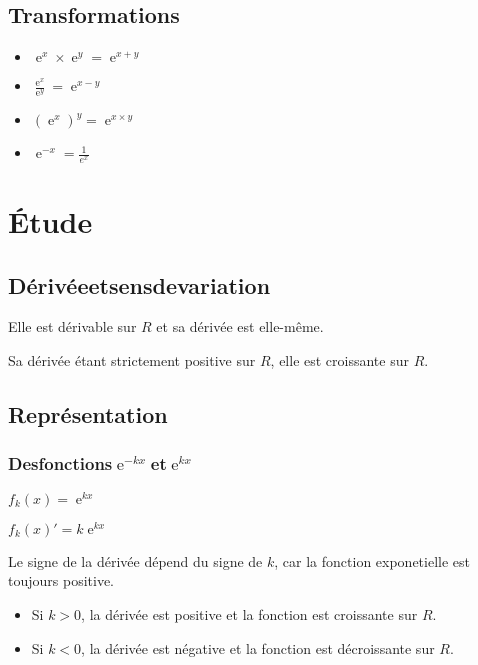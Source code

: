 \documentclass[a4paper,10pt,french,twocolumn]{scrartcl}
\DeclareMathOperator{\e}{e}
\begin{document}
\subsection{Transformations}
\begin{itemize}
 \item $\e^x \times \e^y = \e^{x+y}$
 \item $\frac{\e^x}{\e^y} = \e^{x-y}$
 \item $(\e^x)^y = \e^{x \times y}$
 \item $ \e^{-x} = \frac{1}{e^x}$
\end{itemize}
\section{\'Etude}
\subsection{D\'eriv\'ee\:et\:sens\:de\:variation}
Elle est d\'erivable sur $R$ et sa d\'eriv\'ee est elle-m\^eme.

Sa d\'eriv\'ee \'etant strictement positive sur $R$, elle est croissante sur $R$.
\subsection{Repr\'esentation}
\subsubsection{Des\:fonctions\:$\e^{-kx}$\:et\:$\e^{kx}$}
$f_k(x) = \e^{kx}$

$f_k(x)' = k \e^{kx}$

Le signe de la d\'eriv\'ee d\'epend du signe de $k$, car la fonction exponetielle est toujours positive.

\begin{itemize}
 \item Si $k > 0$, la d\'eriv\'ee est positive et la fonction est croissante sur $R$.
 \item Si $k < 0$, la d\'eriv\'ee est n\'egative et la fonction est d\'ecroissante sur $R$.
\end{itemize}
\end{document}
